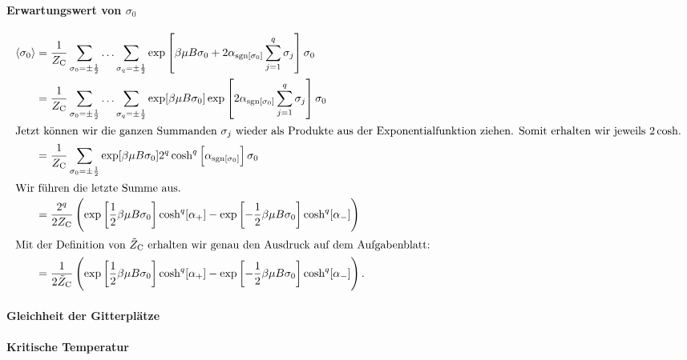 \fehlt

\paragraph{Erwartungswert von $\sigma_0$}

\begin{align*}
    \bracket{\sigma_0}
    &= \frac{1}{Z_\text C} \sum_{\sigma_0 = \pm\frac12} \ldots \sum_{\sigma_q = \pm\frac12}
    \exp\sbr{\beta \mu B \sigma_0 + 2 \alpha_{\sgn[\sigma_0]} \sum_{j=1}^q
    \sigma_j} \sigma_0 \\
    &= \frac{1}{Z_\text C} \sum_{\sigma_0 = \pm\frac12} \ldots \sum_{\sigma_q = \pm\frac12}
    \exp[\beta \mu B \sigma_0] 
    \exp\sbr{2 \alpha_{\sgn[\sigma_0]} \sum_{j=1}^q
    \sigma_j} \sigma_0 \\
    \intertext{%
        Jetzt können wir die ganzen Summanden $\sigma_j$ wieder als Produkte
        aus der Exponentialfunktion ziehen. Somit erhalten wir jeweils $2
        \cosh$.
    }
    &= \frac{1}{Z_\text C} \sum_{\sigma_0 = \pm\frac12}
    \exp[\beta \mu B \sigma_0] 
    2^q \cosh^q\sbr{\alpha_{\sgn[\sigma_0]}} \sigma_0 \\
    \intertext{%
        Wir führen die letzte Summe aus.
    }
    &= \frac{2^q}{2 Z_\text C} \del{
        \exp\sbr{\frac 12 \beta \mu B \sigma_0} \cosh^q[\alpha_+]
        - \exp\sbr{-\frac 12 \beta \mu B \sigma_0} \cosh^q[\alpha_-]
    } \\
    \intertext{%
        Mit der Definition von $\tilde Z_\text C$ erhalten wir genau den
        Ausdruck auf dem Aufgabenblatt:
    }
    &= \frac{1}{2 \tilde Z_\text C} \del{
        \exp\sbr{\frac 12 \beta \mu B \sigma_0} \cosh^q[\alpha_+]
        - \exp\sbr{-\frac 12 \beta \mu B \sigma_0} \cosh^q[\alpha_-]
    }.
\end{align*}


\paragraph{Gleichheit der Gitterplätze}

\fehlt

\paragraph{Kritische Temperatur}

\fehlt

\IfFileExists{\bibliographyfile}{
    \printbibliography
}{}



